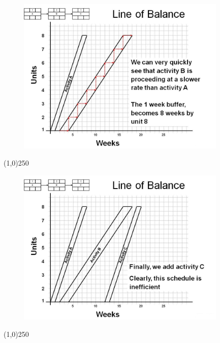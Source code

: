 \begin{frame}
\begin{figure}
	\centering
		\includegraphics[width = 10.0cm]{oldnotes/Slide249.jpg}
\end{figure}
\end{frame}
\begin{center}\line(1,0){250}\end{center}






\begin{frame}
\begin{figure}
	\centering
		\includegraphics[width = 10.0cm]{oldnotes/Slide250.jpg}
\end{figure}
\end{frame}
\begin{center}\line(1,0){250}\end{center}






